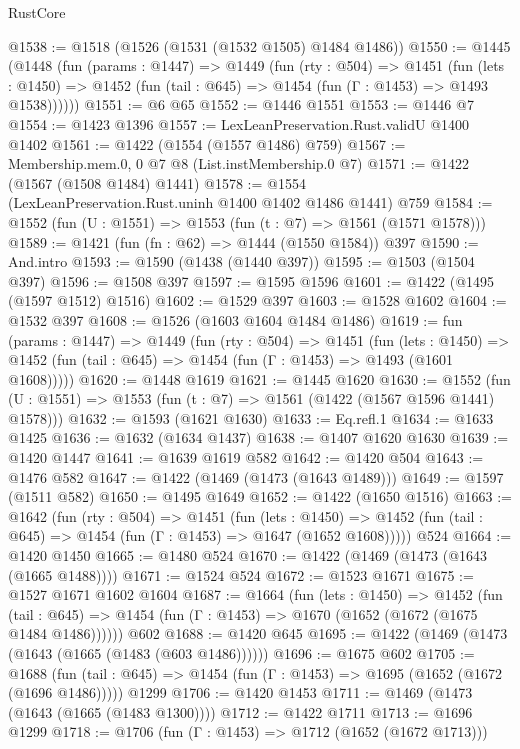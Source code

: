 \begin{lexlean}{RustCore}
\begin{coremodule}
@1538 := @1518 (@1526 (@1531 (@1532 @1505) @1484 @1486))
@1550 := @1445
    (@1448
      (fun (params : @1447) =>
      @1449
        (fun (rty : @504) =>
        @1451
          (fun (lets : @1450) =>
          @1452 (fun (tail : @645) => @1454 (fun (Γ : @1453) => @1493 @1538))))))
@1551 := @6 @65
@1552 := @1446 @1551
@1553 := @1446 @7
@1554 := @1423 @1396
@1557 := LexLeanPreservation.Rust.validU @1400 @1402
@1561 := @1422 (@1554 (@1557 @1486) @759)
@1567 := Membership.mem.{0, 0} @7 @8 (List.instMembership.{0} @7)
@1571 := @1422 (@1567 (@1508 @1484) @1441)
@1578 := @1554 (LexLeanPreservation.Rust.uninh @1400 @1402 @1486 @1441) @759
@1584 := @1552 (fun (U : @1551) => @1553 (fun (t : @7) => @1561 (@1571 @1578)))
@1589 := @1421 (fun (fn : @62) => @1444 (@1550 @1584)) @397
@1590 := And.intro
@1593 := @1590 (@1438 (@1440 @397))
@1595 := @1503 (@1504 @397)
@1596 := @1508 @397
@1597 := @1595 @1596
@1601 := @1422 (@1495 (@1597 @1512) @1516)
@1602 := @1529 @397
@1603 := @1528 @1602
@1604 := @1532 @397
@1608 := @1526 (@1603 @1604 @1484 @1486)
@1619 := fun (params : @1447) =>
  @1449
    (fun (rty : @504) =>
    @1451
      (fun (lets : @1450) =>
      @1452 (fun (tail : @645) => @1454 (fun (Γ : @1453) => @1493 (@1601 @1608)))))
@1620 := @1448 @1619
@1621 := @1445 @1620
@1630 := @1552 (fun (U : @1551) => @1553 (fun (t : @7) => @1561 (@1422 (@1567 @1596 @1441) @1578)))
@1632 := @1593 (@1621 @1630)
@1633 := Eq.refl.{1}
@1634 := @1633 @1425
@1636 := @1632 (@1634 @1437)
@1638 := @1407 @1620 @1630
@1639 := @1420 @1447
@1641 := @1639 @1619 @582
@1642 := @1420 @504
@1643 := @1476 @582
@1647 := @1422 (@1469 (@1473 (@1643 @1489)))
@1649 := @1597 (@1511 @582)
@1650 := @1495 @1649
@1652 := @1422 (@1650 @1516)
@1663 := @1642
    (fun (rty : @504) =>
    @1451
      (fun (lets : @1450) =>
      @1452 (fun (tail : @645) => @1454 (fun (Γ : @1453) => @1647 (@1652 @1608)))))
    @524
@1664 := @1420 @1450
@1665 := @1480 @524
@1670 := @1422 (@1469 (@1473 (@1643 (@1665 @1488))))
@1671 := @1524 @524
@1672 := @1523 @1671
@1675 := @1527 @1671 @1602 @1604
@1687 := @1664
    (fun (lets : @1450) =>
    @1452
      (fun (tail : @645) => @1454 (fun (Γ : @1453) => @1670 (@1652 (@1672 (@1675 @1484 @1486))))))
    @602
@1688 := @1420 @645
@1695 := @1422 (@1469 (@1473 (@1643 (@1665 (@1483 (@603 @1486))))))
@1696 := @1675 @602
@1705 := @1688
    (fun (tail : @645) => @1454 (fun (Γ : @1453) => @1695 (@1652 (@1672 (@1696 @1486)))))
    @1299
@1706 := @1420 @1453
@1711 := @1469 (@1473 (@1643 (@1665 (@1483 @1300))))
@1712 := @1422 @1711
@1713 := @1696 @1299
@1718 := @1706 (fun (Γ : @1453) => @1712 (@1652 (@1672 @1713)))

\end{coremodule}
\end{lexlean}
